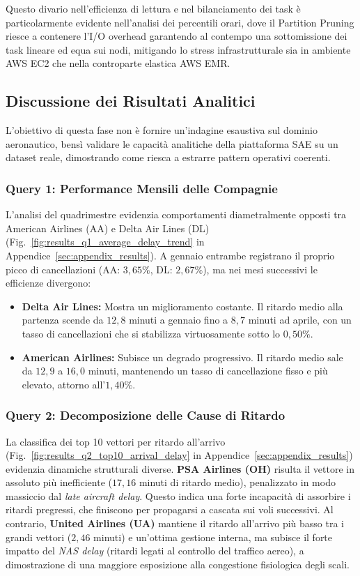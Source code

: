 \documentclass[conference]{IEEEtran}
\begin{document}
Questo divario nell'efficienza di lettura e nel bilanciamento dei task è particolarmente evidente nell'analisi dei percentili orari, dove il Partition Pruning riesce a contenere l'I/O overhead garantendo al contempo una sottomissione dei task lineare ed equa sui nodi, mitigando lo stress infrastrutturale sia in ambiente AWS EC2 che nella controparte elastica AWS EMR\@.

\subsection{Discussione dei Risultati Analitici}\label{subsec:analytical_results_discussion}

L'obiettivo di questa fase non è fornire un'indagine esaustiva sul dominio aeronautico, bensì validare le capacità analitiche della piattaforma SAE su un dataset reale, dimostrando come riesca a estrarre pattern operativi coerenti.

\subsubsection{Query 1: Performance Mensili delle Compagnie}
L'analisi del quadrimestre evidenzia comportamenti diametralmente opposti tra American Airlines (AA) e Delta Air Lines (DL) (Fig.~\ref{fig:results_q1_average_delay_trend} in Appendice~\ref{sec:appendix_results}). A gennaio entrambe registrano il proprio picco di cancellazioni (AA: $3,65\%$, DL: $2,67\%$), ma nei mesi successivi le efficienze divergono:
\begin{itemize}
    \item \textbf{Delta Air Lines:} Mostra un miglioramento costante.
    Il ritardo medio alla partenza scende da $12,8$ minuti a gennaio fino a $8,7$ minuti ad aprile, con un tasso di cancellazioni che si stabilizza virtuosamente sotto lo $0,50\%$.
    \item \textbf{American Airlines:} Subisce un degrado progressivo.
    Il ritardo medio sale da $12,9$ a $16,0$ minuti, mantenendo un tasso di cancellazione fisso e più elevato, attorno all'$1,40\%$.
\end{itemize}

\subsubsection{Query 2: Decomposizione delle Cause di Ritardo}
La classifica dei top 10 vettori per ritardo all'arrivo (Fig.~\ref{fig:results_q2_top10_arrival_delay} in Appendice~\ref{sec:appendix_results}) evidenzia dinamiche strutturali diverse.
\textbf{PSA Airlines (OH)} risulta il vettore in assoluto più inefficiente ($17,16$ minuti di ritardo medio), penalizzato in modo massiccio dal \textit{late aircraft delay}.
Questo indica una forte incapacità di assorbire i ritardi pregressi, che finiscono per propagarsi a cascata sui voli successivi.
Al contrario, \textbf{United Airlines (UA)} mantiene il ritardo all'arrivo più basso tra i grandi vettori ($2,46$ minuti) e un'ottima gestione interna, ma subisce il forte impatto del \textit{NAS delay} (ritardi legati al controllo del traffico aereo), a dimostrazione di una maggiore esposizione alla congestione fisiologica degli scali.
\end{document}
